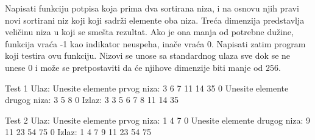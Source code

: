 \begin{Answer}[ref=504]
\end{Answer}
\begin{Exercise}[label=505]
  Napisati funkciju potpisa  koja prima dva sortirana
  niza, i na osnovu njih pravi novi sortirani niz koji koji sadrži
  elemente oba niza. Treća dimenzija predstavlja veličinu niza u koji
  se smešta rezultat. Ako je ona manja od potrebne dužine, funkcija
  vraća -1 kao indikator neuspeha, inače vraća 0. Napisati zatim program
  koji testira ovu funkciju. Nizovi se unose sa standardnog ulaza sve dok se ne unese 0 i 
  može se pretpostaviti da će njihove dimenzije biti manje od $256$.
  
\begin{miditest}
\begin{test}{Test 1}
Ulaz:   
Unesite elemente prvog niza: 
3 6 7 11 14 35 0 
Unesite elemente drugog niza: 
3 5 8 0
Izlaz:  
3 3 5 6 7 8 11 14 35
\end{test}
\end{miditest}

\begin{miditest}
\begin{test}{Test 2}
Ulaz:   
Unesite elemente prvog niza:
1 4 7 0 
Unesite elemente drugog niza: 
9 11 23 54 75 0
Izlaz:  
1 4 7 9 11 23 54 75
\end{test}
\end{miditest}
  
\end{Exercise}

